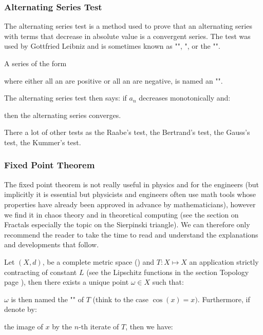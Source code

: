 	\subsubsection{Alternating Series Test}
	The alternating series test is a method used to prove that an alternating series with terms that decrease in absolute value is a convergent series. The test was used by Gottfried Leibniz and is sometimes known as "", ", or the "".
	
	A series of the form
	
	where either all an are positive or all an are negative, is named an "".

	The alternating series test then says: if $a_n$ decreases monotonically and:
	
 	then the alternating series converges.
	
	There a lot of other tests as the Raabe's test, the Bertrand's test, the Gauss's test, the Kummer's test.
	
	\subsubsection{Fixed Point Theorem}\label{fixed point theorem}
	The fixed point theorem is not really useful in physics and for the engineers (but implicitly it is essential but physicists and engineers often use math tools whose properties have already been approved in advance by mathematicians), however we find it in chaos theory and in theoretical computing (see the section on Fractals especially the topic on the Sierpinski triangle). We can therefore only recommend the reader to take the time to read and understand the explanations and developments that follow.
	
	Let $(X,d)$, be a complete metric space () and $T:X\mapsto X$ an application strictly contracting of constant $L$ (see the Lipschitz functions in the section Topology page \pageref{lipschitz functions}), then there exists a unique point $\omega\in X$ such that:
	
	$\omega$ is then named the "" of $T$ (think to the case $\cos(x)=x)$. Furthermore, if denote by:
	
	the image of $x$ by the $n$-th iterate of $T$, then we have:
	
